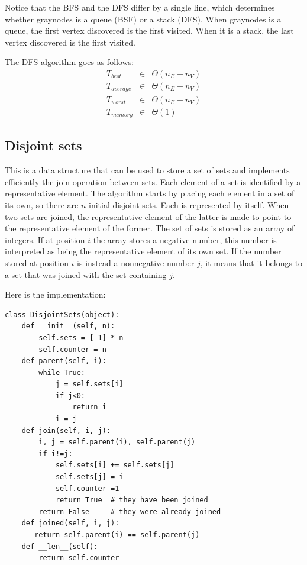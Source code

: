 \documentclass[justified, sixbynine]{tufte-book}
\def\ft{\small\tt}
\theoremstyle{plain}%
\newtheorem * {corollary}{Corollary}
\theoremstyle{definition}
\theoremstyle{remark}
\newtheorem * {remark}{Remark}
\newtheorem * {note}{Note}
\begin{document}
\begin{fullwidth}
Notice that the BFS and the DFS differ by a single line, which determines whether graynodes is a queue (BSF) or a stack (DFS). When graynodes is a queue, the first vertex discovered is the first visited. When it is a stack, the last vertex discovered is the first visited.

The DFS algorithm goes as follows:
\begin{eqnarray}
T_{best} &\in &\Theta (n_E+n_V) \\
T_{average} &\in &\Theta (n_E+n_V) \\
T_{worst} &\in &\Theta (n_E+n_V) \\
T_{memory} &\in &\Theta (1)
\end{eqnarray}

\subsection{Disjoint sets}


This is a data structure that can be used to store a set of sets and implements efficiently the join operation between sets.
Each element of a set is identified by a representative element. The algorithm starts by placing each element in a set of its own, so there are $n$ initial disjoint sets. Each is represented by itself. When two sets are joined, the representative element of the latter is made to point to the representative element of the former. The set of sets is stored as an array of integers. If at position $i$ the array stores a negative number, this number is interpreted as being the representative element of its own set. If the number stored at position $i$ is instead a nonnegative number $j$, it means that it belongs to a set that was joined with the set containing $j$.

Here is the implementation:


\begin{lstlisting}[caption={in file: {\ft nlib.py}}]
class DisjointSets(object):
    def __init__(self, n):
        self.sets = [-1] * n
        self.counter = n
    def parent(self, i):
        while True:
            j = self.sets[i]
            if j<0:
                return i
            i = j
    def join(self, i, j):
        i, j = self.parent(i), self.parent(j)
        if i!=j:
            self.sets[i] += self.sets[j]
            self.sets[j] = i
            self.counter-=1
            return True  # they have been joined
        return False     # they were already joined
    def joined(self, i, j):
       return self.parent(i) == self.parent(j)
    def __len__(self):
        return self.counter
\end{lstlisting}


\end{fullwidth}
\end{document}
